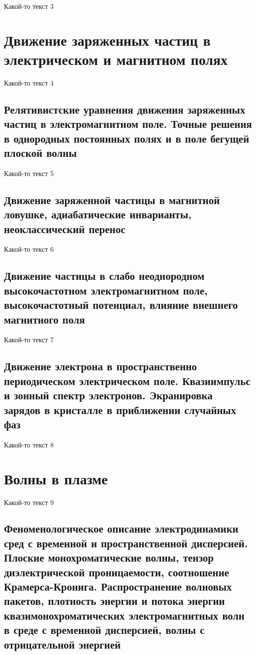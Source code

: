 \documentclass[10pt, a4paper]{article}
\numberwithin{equation}{section}
\begin{document}
Какой-то текст 3

\section{Движение заряженных частиц в электрическом и магнитном полях}

Какой-то текст 4

\subsection{Релятивистские уравнения движения заряженных частиц в электромагнитном поле. Точные решения в однородных постоянных полях и в поле бегущей плоской волны}

Какой-то текст 5

\subsection{Движение заряженной частицы в магнитной ловушке, адиабатические инварианты, неоклассический перенос}

Какой-то текст 6

\subsection{Движение частицы в слабо неоднородном высокочастотном электромагнитном поле, высокочастотный потенциал, влияние внешнего магнитного поля}

Какой-то текст 7

\subsection{Движение электрона в пространственно периодическом электрическом поле. Квазиимпульс и зонный спектр электронов. Экранировка зарядов в кристалле в приближении случайных фаз}

Какой-то текст 8

\section{Волны в плазме}

Какой-то текст 9

\subsection{Феноменологическое описание электродинамики сред с временной и пространственной дисперсией. Плоские монохроматические волны, тензор диэлектрической проницаемости, 	соотношение Крамерса-Кронига. Распространение волновых пакетов, плотность энергии и потока энергии квазимонохроматических электромагнитных волн в среде с временной дисперсией, волны с отрицательной энергией}
\end{document}
